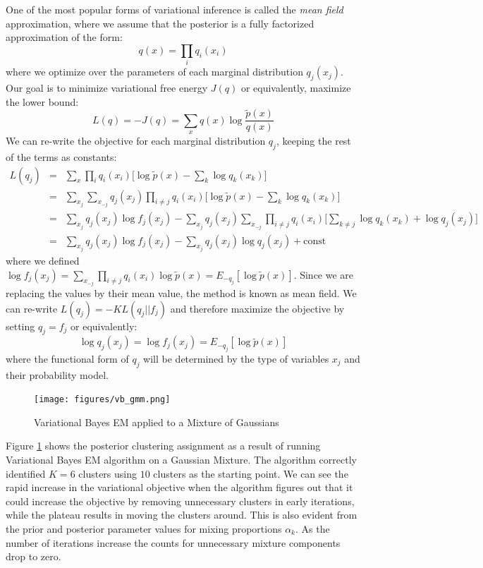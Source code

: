 One of the most popular forms of variational inference is called the \textit{mean field} approximation, where we assume that the posterior is a fully factorized approximation of the form:
\begin{equation}
    q(x) = \prod_i q_i(x_i)
\end{equation}
where we optimize over the parameters of each marginal distribution $q_j(x_j)$. Our goal is to minimize variational free energy $J(q)$ or equivalently, maximize the lower bound:
\begin{equation}
    L(q) = -J(q) = \sum_x q(x)\log \frac{\tilde{p}(x)}{q(x)}
\end{equation}
We can re-write the objective for each marginal distribution $q_j$, keeping the rest of the terms as constants:
\begin{eqnarray}
    L(q_j) &=& \sum_x \prod_i q_i(x_i)\bigg[\log \tilde{p}(x) - \sum_k \log q_k(x_k)  \bigg] \\
    &=& \sum_{x_j}\sum_{x_{-j}}q_j(x_j)\prod_{i\neq j}q_i(x_i)\bigg[\log \tilde{p}(x) - \sum_k \log q_k(x_k) \bigg] \\
    &=& \sum_{x_j}q_j(x_j)\log f_j(x_j) - \sum_{x_j}q_j(x_j)\sum_{x_{-j}}\prod_{i\neq j}q_i(x_i)\bigg[\sum_{k\neq j}\log q_k(x_k) + \log q_j(x_j) \bigg] \\
    &=& \sum_{x_j}q_j(x_j)\log f_j(x_j) - \sum_{x_j}q_j(x_j)\log q_j(x_j) + \mathrm{const}
\end{eqnarray}
where we defined $\log f_j(x_j) = \sum_{x_{-j}}\prod_{i\neq j}q_i(x_i)\log \tilde{p}(x) = E_{-q_j}[\log \tilde{p}(x)]$. Since we are replacing the values by their mean value, the method is known as mean field. We can re-write $L(q_j) = -KL(q_j||f_j)$ and therefore maximize the objective by setting $q_j = f_j$ or equivalently:
\begin{equation}
    \log q_j(x_j) = \log f_j(x_j) = E_{-q_j}[\log \tilde{p}(x)]
\end{equation}
where the functional form of $q_j$ will be determined by the type of variables $x_j$ and their probability model.\\

\begin{figure}[tbhp]
    \centering
    \texttt{[image: figures/vb\_gmm.png]}
    \caption{Variational Bayes EM applied to a Mixture of Gaussians}
    \label{fig:vb_gmm}
\end{figure}

Figure \ref{fig:vb_gmm} shows the posterior clustering assignment as a result of running Variational Bayes EM algorithm on a Gaussian Mixture. The algorithm correctly identified $K=6$ clusters using $10$ clusters as the starting point. We can see the rapid increase in the variational objective when the algorithm figures out that it could increase the objective by removing unnecessary clusters in early iterations, while the plateau results in moving the clusters around. This is also evident from the prior and posterior parameter values for mixing proportions $\alpha_k$. As the number of iterations increase the counts for unnecessary mixture components drop to zero. 


